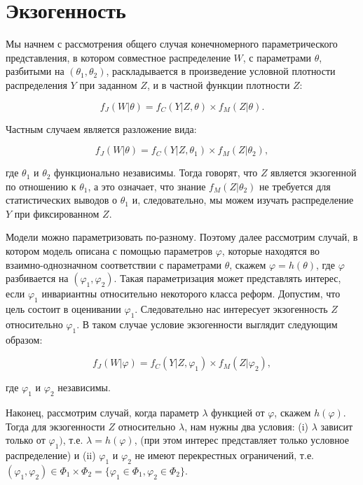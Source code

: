 	
\section{Экзогенность}

	
Мы начнем с рассмотрения общего случая конечномерного параметрического представления, в котором совместное распределение $W$, с параметрами $\theta$, разбитыми на $(\theta_{1},\theta_{2})$, раскладывается в произведение условной плотности распределения $Y$ при заданном $Z$, и в частной функции плотности $Z$:


\begin{equation}
f_{J}(W|\theta)=f_{C}(Y|Z,\theta)\times f_{M}(Z|\theta).
\end{equation}

Частным случаем является разложение вида:

\[
f_{J}(W|\theta)=f_{C}(Y|Z,\theta_{1})\times f_{M}(Z|\theta_{2}),
\]

где $ \theta_{1} $ и $ \theta_{2} $ функционально независимы. Тогда говорят, что $Z$ является экзогенной по отношению к  $ \theta_{1} $, а это означает, что знание $ f_{M}(Z|\theta_{2}) $  не требуется для статистических выводов о $ \theta_{1}$ и, следовательно, мы можем изучать распределение $Y$ при фиксированном  $Z$. 


Модели можно параметризовать по-разному. Поэтому далее рассмотрим случай, в котором модель описана с помощью параметров $\varphi$, которые находятся во  взаимно-однозначном соответствии с параметрами $\theta$, скажем $\varphi=h(\theta)$, где $\varphi$ разбивается на $(\varphi_{1},\varphi_{2})$. Такая параметризация может представлять интерес, если $\varphi_1$ инвариантны относительно некоторого класса реформ. Допустим, что цель состоит в оценивании $\varphi_1$. Следовательно нас интересует экзогенность $Z$ относительно $\varphi_1$. В таком случае условие экзогенности выглядит следующим образом:
	
\begin{equation}
f_{J}(W|\varphi)=f_{C}(Y|Z,\varphi_{1})\times f_{M}(Z|\varphi_{2}),
\end{equation}

где $\varphi_{1}$ и $\varphi_{2}$ независимы.

Наконец, рассмотрим случай, когда параметр $\lambda$ функцией от $\varphi$, скажем $h(\varphi)$. Тогда для экзогенности $Z$ относительно $\lambda$, нам нужны два условия: (i) $\lambda$ зависит только от $ \varphi_{1}) $, т.е. $\lambda=h(\varphi)$, (при этом интерес представляет только условное распределение) и (ii) $\varphi_{1}$ и $\varphi_{2}$ не имеют перекрестных ограничений, т.е. $(\varphi_{1}, \varphi_{2}) \in \Phi_{1}\times\Phi_{2} = \lbrace\varphi_{1} \in \Phi_{1}, \varphi_{2} \in \Phi_{2}\rbrace$. 

